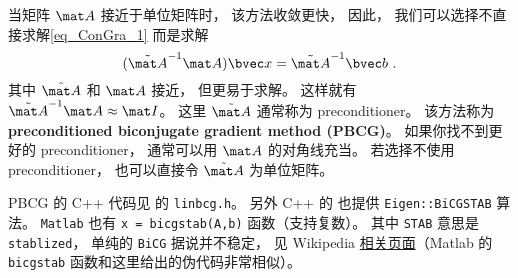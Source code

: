 当矩阵 $\mat A$ 接近于单位矩阵时， 该方法收敛更快， 因此， 我们可以选择不直接求解\autoref{eq_ConGra_1} 而是求解
\begin{equation}
(\tilde {\mat A}^{-1}\mat A) \bvec x = \tilde {\mat A}^{-1}\bvec b~.
\end{equation}
其中 $\tilde {\mat A}$ 和 $\mat A$ 接近， 但更易于求解。 这样就有 $\tilde {\mat A}^{-1}\mat A \approx \mat I$。 这里 $\tilde {\mat A}$ 通常称为 preconditioner。 该方法称为 \textbf{preconditioned biconjugate gradient method (PBCG)}。 如果你找不到更好的 preconditioner， 通常可以用 $\mat A$ 的对角线充当。 若选择不使用 preconditioner， 也可以直接令 $\tilde {\mat A}$ 为单位矩阵。

PBCG 的 C++ 代码见 \cite{NR3} 的 \verb|linbcg.h|。 另外 C++ 的 也提供 \verb|Eigen::BiCGSTAB| 算法。 \verb|Matlab| 也有 \verb|x = bicgstab(A,b)| 函数（支持复数）。 其中 \verb|STAB| 意思是 \verb|stablized|， 单纯的 \verb|BiCG| 据说并不稳定， 见 Wikipedia \href{https://en.wikipedia.org/wiki/Biconjugate_gradient_stabilized_method}{相关页面}（Matlab 的 \verb|bicgstab| 函数和这里给出的伪代码非常相似）。
